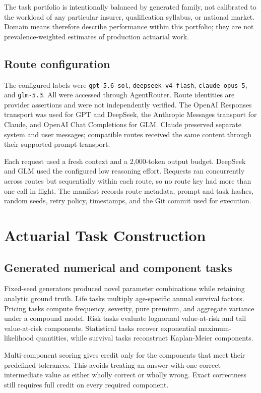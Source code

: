 \documentclass[11pt]{article}
\begin{document}
The task portfolio is intentionally balanced by generated family, not calibrated to the workload of any particular insurer, qualification syllabus, or national market. Domain means therefore describe performance within this portfolio; they are not prevalence-weighted estimates of production actuarial work.

\subsection{Route configuration}

The configured labels were \texttt{gpt-5.6-sol}, \texttt{deepseek-v4-flash}, \texttt{claude-opus-5}, and \texttt{glm-5.3}. All were accessed through AgentRouter. Route identities are provider assertions and were not independently verified. The OpenAI Responses transport was used for GPT and DeepSeek, the Anthropic Messages transport for Claude, and OpenAI Chat Completions for GLM. Claude preserved separate system and user messages; compatible routes received the same content through their supported prompt transport.

Each request used a fresh context and a 2,000-token output budget. DeepSeek and GLM used the configured low reasoning effort. Requests ran concurrently across routes but sequentially within each route, so no route key had more than one call in flight. The manifest records route metadata, prompt and task hashes, random seeds, retry policy, timestamps, and the Git commit used for execution.

\section{Actuarial Task Construction}

\subsection{Generated numerical and component tasks}

Fixed-seed generators produced novel parameter combinations while retaining analytic ground truth. Life tasks multiply age-specific annual survival factors. Pricing tasks compute frequency, severity, pure premium, and aggregate variance under a compound model. Risk tasks evaluate lognormal value-at-risk and tail value-at-risk components. Statistical tasks recover exponential maximum-likelihood quantities, while survival tasks reconstruct Kaplan-Meier components.

Multi-component scoring gives credit only for the components that meet their predefined tolerances. This avoids treating an answer with one correct intermediate value as either wholly correct or wholly wrong. Exact correctness still requires full credit on every required component.
\end{document}
